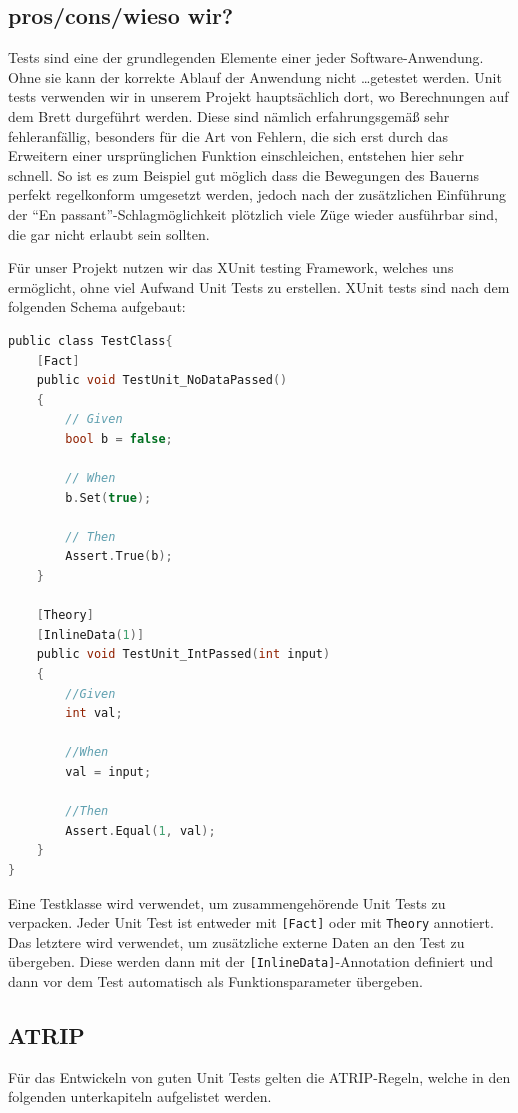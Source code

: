 \documentclass[
10pt, %
a4paper, %
oneside, %
headinclude,footinclude, %
BCOR5mm, %
]{scrartcl}
\begin{document}
\begin{onehalfspace}
\subsection{pros/cons/wieso wir?}
Tests sind eine der grundlegenden Elemente einer jeder Software-Anwendung. Ohne sie kann der korrekte Ablauf der Anwendung nicht \dots getestet werden. Unit tests verwenden wir in unserem Projekt hauptsächlich dort, wo Berechnungen auf dem Brett durgeführt werden. Diese sind nämlich erfahrungsgemäß sehr fehleranfällig, besonders für die Art von Fehlern, die sich erst durch das Erweitern einer ursprünglichen Funktion einschleichen, entstehen hier sehr schnell. So ist es zum Beispiel gut möglich dass die Bewegungen des Bauerns perfekt regelkonform umgesetzt werden, jedoch nach der zusätzlichen Einführung der \enquote{En passant}-Schlagmöglichkeit plötzlich viele Züge wieder ausführbar sind, die gar nicht erlaubt sein sollten.

Für unser Projekt nutzen wir das XUnit testing Framework, welches uns ermöglicht, ohne viel Aufwand Unit Tests zu erstellen.
XUnit tests sind nach dem folgenden Schema aufgebaut:
\begin{lstlisting}[language=c, style=mStyle]
public class TestClass{
	[Fact]
	public void TestUnit_NoDataPassed()
	{
		// Given
		bool b = false;

		// When
		b.Set(true);

		// Then
		Assert.True(b);
	}

	[Theory]
	[InlineData(1)]
	public void TestUnit_IntPassed(int input)
	{
		//Given
		int val;

		//When
		val = input;

		//Then
		Assert.Equal(1, val);
	}
}
\end{lstlisting}

Eine Testklasse wird verwendet, um zusammengehörende Unit Tests zu verpacken. Jeder Unit Test ist entweder mit \texttt{[Fact]} oder mit \texttt{Theory} annotiert. Das letztere wird verwendet, um zusätzliche externe Daten an den Test zu übergeben. Diese werden dann mit der \texttt{[InlineData]}-Annotation definiert und dann vor dem Test automatisch als Funktionsparameter übergeben.
\subsection{ATRIP}
Für das Entwickeln von guten Unit Tests gelten die ATRIP-Regeln, welche in den folgenden unterkapiteln aufgelistet werden.

\end{onehalfspace}
\end{document}
